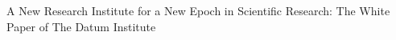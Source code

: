 A New Research Institute for a New Epoch in Scientific Research: The White Paper of The Datum Institute